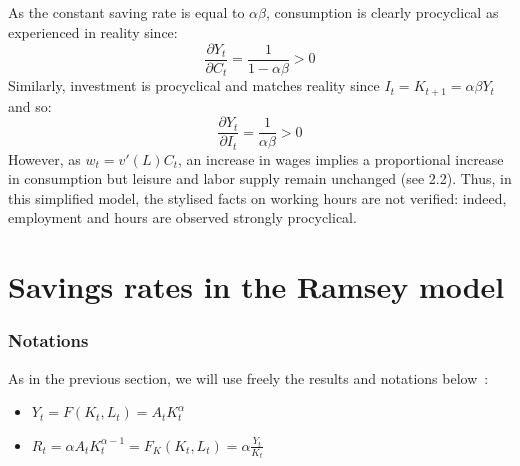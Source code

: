 \documentclass[12pt]{article}
\begin{document}
\subsection{}
As the constant saving rate is equal to $\alpha \beta $, consumption is clearly procyclical as experienced in reality since: 
\begin{equation*}
    \frac{\partial Y_t}{\partial C_t} = \frac{1}{1 - \alpha \beta} > 0
\end{equation*}
Similarly, investment is procyclical and matches reality since $I_t = K_{t+1} = \alpha \beta Y_t$ and so:
\begin{equation*}
    \frac{\partial Y_t}{\partial I_t} = \frac{1}{\alpha \beta} > 0
\end{equation*}
However, as $w_t = v'(L)C_t$, an increase in wages implies a proportional increase in consumption but leisure and labor supply remain unchanged (see 2.2). Thus, in this simplified model, the stylised facts on working hours are not verified: indeed, employment and hours are observed strongly procyclical.  

\section{Savings rates in the Ramsey model}
\subsubsection*{Notations}
As in the previous section, we will use freely the results and notations below~:
\begin{itemize}
    \item $Y_t = F(K_t, L_t) = A_t K_t^{\alpha}$
    \item $\displaystyle R_t = \alpha A_t K_t^{\alpha -1 } = F_K(K_t, L_t) = \alpha \frac{Y_t}{K_t}$
\end{itemize}
\end{document}
